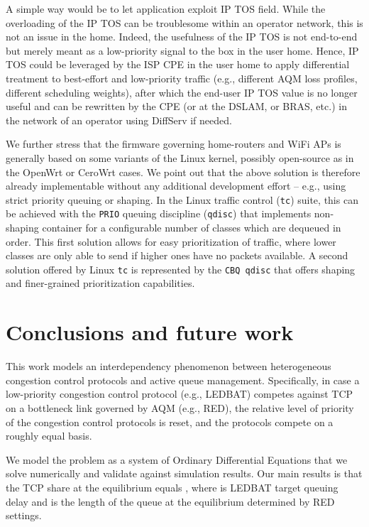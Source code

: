 \documentclass[conference]{IEEEtran}
\newcommand{\secL}[1]{\label{sec:#1}}
\begin{document}
A simple way would be to let application exploit IP TOS field. While the overloading of the IP TOS can be troublesome within an operator network, this is not an issue in the home. Indeed, the usefulness of the IP TOS is not end-to-end but merely meant as a low-priority signal to the box in the user home. Hence, IP TOS could be leveraged by the ISP CPE in the user home to apply differential treatment to best-effort and low-priority traffic (e.g., different AQM loss profiles, different scheduling weights), after which the end-user IP TOS value is no longer useful and can be rewritten by the CPE  (or at the DSLAM, or BRAS, etc.) in the network of an operator using DiffServ if needed.

We further stress that the firmware governing home-routers and WiFi APs is generally based on some variants of the Linux kernel, possibly open-source as in the OpenWrt or CeroWrt cases. We point out that the above solution is therefore already implementable without any additional development effort -- e.g., using strict priority queuing or shaping. In the Linux traffic control (\texttt{tc}) suite, this can be achieved with the \texttt{PRIO} queuing discipline (\texttt{qdisc}) that implements non-shaping container for a configurable number of classes which are dequeued in order. This first solution allows for easy prioritization of traffic, where lower classes are only able to send if higher ones have no packets available. A second solution offered by Linux \texttt{tc} is represented by the \texttt{CBQ qdisc} that offers shaping and finer-grained prioritization capabilities. 




\section{Conclusions and future work}\secL{conclusion}

This work models an interdependency phenomenon between heterogeneous congestion control protocols and active queue management.
Specifically, in case a low-priority congestion control protocol (e.g., LEDBAT) competes against TCP on a bottleneck link governed by AQM (e.g., RED), the relative level of priority of the congestion control protocols is reset, and the protocols compete on a roughly equal basis.

We model the problem as a system of Ordinary Differential Equations that we solve numerically and validate against simulation results. Our main results is that the TCP share at the equilibrium equals , where  is LEDBAT target queuing delay and  is the length of the queue at the equilibrium determined by RED settings.
\end{document}
